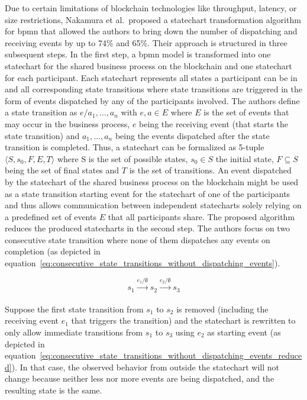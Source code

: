 Due to certain limitations of blockchain technologies like throughput, latency, or size restrictions, Nakamura et al.\ proposed a statechart transformation algorithm for \gls{bpmn} that allowed the authors to bring down the number of dispatching and receiving events by up to 74\% and 65\%. Their approach is structured in three subsequent steps. In the first step, a \gls{bpmn} model is transformed into one statechart for the shared business process on the blockchain and one statechart for each participant. Each statechart represents all states a participant can be in and all corresponding state transitions where state transitions are triggered in the form of events dispatched by any of the participants involved. The authors define a state transition as $e/a_1,\ldots,a_n$ with $e,a \in E$ where $E$ is the set of events that may occur in the business process, $e$ being the receiving event (that starts the state transition) and $a_1,\ldots,a_n$ being the events dispatched after the state transition is completed. Thus, a statechart can be formalized as 5-tuple $\langle S, s_0, F, E, T \rangle$ where S is the set of possible states, $s_0 \in S$ the initial state, $F \subseteq S$ being the set of final states and $T$ is the set of transitions. An event dispatched by the statechart of the shared business process on the blockchain might be used as a state transition starting event for the statechart of one of the participants and thus allows communication between independent statecharts solely relying on a predefined set of events $E$ that all participants share. The proposed algorithm reduces the produced statecharts in the second step. The authors focus on two consecutive state transition where none of them dispatches any events on completion (as depicted in equation~\ref{eq:consecutive_state_transitions_without_dispatching_events}).

\begin{equation}
    s_1 \xrightarrow[]{e_1/\emptyset} s_2 \xrightarrow[]{e_2/\emptyset} s_3
    \label{eq:consecutive_state_transitions_without_dispatching_events}
\end{equation}

Suppose the first state transition from $s_1$ to $s_2$ is removed (including the receiving event $e_1$ that triggers the transition) and the statechart is rewritten to only allow immediate transitions from $s_1$ to $s_3$ using $e_2$ as starting event (as depicted in equation~\ref{eq:consecutive_state_transitions_without_dispatching_events_reduced}). In that case, the observed behavior from outside the statechart will not change because neither less nor more events are being dispatched, and the resulting state is the same.

